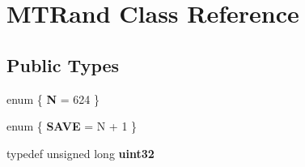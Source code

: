 \hypertarget{classMTRand}{}\section{M\+T\+Rand Class Reference}
\label{classMTRand}
\subsection*{Public Types}
\begin{DoxyCompactItemize}
\item 
\mbox{\label{classMTRand_ab8fea37d16b55e1a0fe06149e325f1b6}} 
enum \{ {\bfseries N} = 624
 \}
\item 
\mbox{\label{classMTRand_a7d9f4f1783a4e45f7834dd5174dfc2a1}} 
enum \{ {\bfseries S\+A\+VE} = N + 1
 \}
\item 
\mbox{\label{classMTRand_a45478edf9e24dcd2a5164bac3889d6a2}} 
typedef unsigned long {\bfseries uint32}
\end{DoxyCompactItemize}

